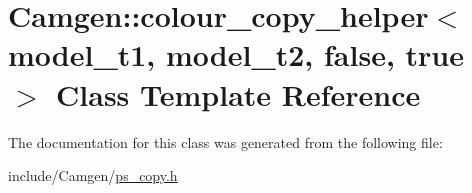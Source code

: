 \hypertarget{a00071}{}\section{Camgen\+:\+:colour\+\_\+copy\+\_\+helper$<$ model\+\_\+t1, model\+\_\+t2, false, true $>$ Class Template Reference}
\label{a00071}


The documentation for this class was generated from the following file\+:\begin{DoxyCompactItemize}
\item 
include/\+Camgen/\hyperlink{a00740}{ps\+\_\+copy.\+h}\end{DoxyCompactItemize}
